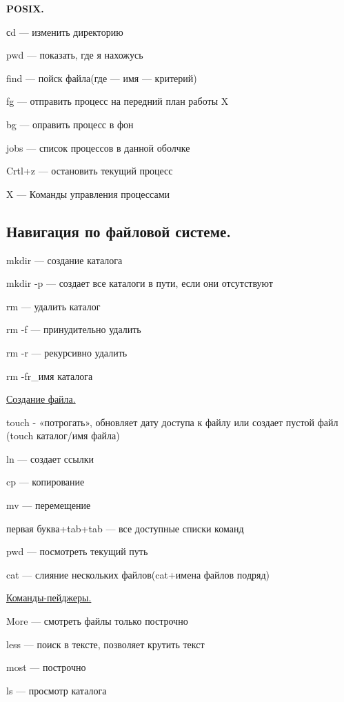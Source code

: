 \par 
\textbf{POSIX.}
\par 
сd — изменить директорию
\par 
pwd — показать, где я нахожусь
\par 
find — пойск файла(где — имя — критерий)
\par fg
— отправить процесс на передний план
работы   X
\par 
bg — оправить процесс в фон
\par 
jobs — список процессов в данной оболчке
\par 
Crtl+z — остановить текущий процесс
\par 
X — Команды управления процессами

\subsection {Навигация по файловой системе.}
\par 
mkdir — создание каталога
\par 
mkdir -p — создает все каталоги в пути, если
они отсутствуют
\par 
rm — удалить каталог
\par 
rm -f — принудительно удалить
\par 
rm -r — рекурсивно удалить
\par 
rm -fr\_имя каталога

\par 
\underline{Создание файла.}
\par 
touch - «потрогать», обновляет дату доступа
к файлу или создает пустой файл (touch
каталог/имя файла)
\par 
ln — создает ссылки
\par 
cp — копирование 

\par 
mv — перемещение
\par 
первая буква+tab+tab — все доступные списки
команд
\par 
pwd — посмотреть текущий путь
\par 
cat — слияние нескольких файлов(cat+имена
файлов подряд)

\par 
\underline{Команды-пейджеры.}
\par 
More — смотреть файлы только построчно
\par 
less — поиск в тексте, позволяет крутить
текст
\par 
most — построчно 

\par 
ls — просмотр каталога

